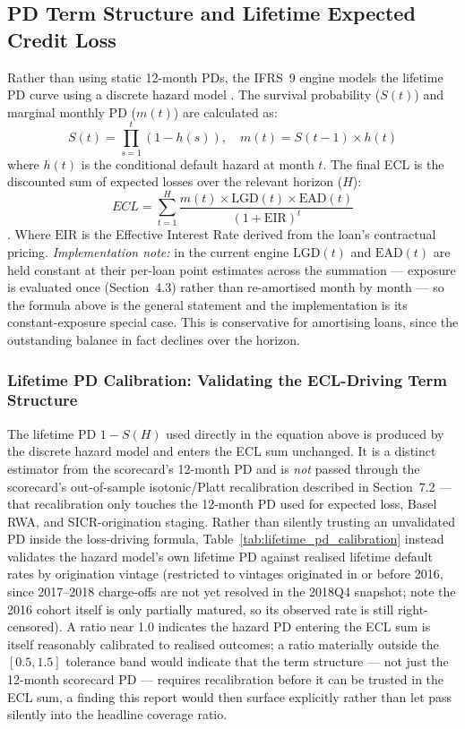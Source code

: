 \documentclass[11pt,a4paper]{article}
\begin{document}
\subsection{PD Term Structure and Lifetime Expected Credit Loss}
Rather than using static 12-month PDs, the IFRS~9 engine models the lifetime PD curve using a discrete hazard model \parencite[Ch.~7]{lando2004}. The survival probability ($S(t)$) and marginal monthly PD ($m(t)$) are calculated as:
\begin{equation}
S(t) = \prod_{s=1}^{t} (1 - h(s)), \quad m(t) = S(t-1) \times h(t)
\end{equation}
where $h(t)$ is the conditional default hazard at month $t$. The final ECL is the discounted sum of expected losses over the relevant horizon ($H$):
\begin{equation}
ECL = \sum_{t=1}^{H} \frac{m(t) \times \text{LGD}(t) \times \text{EAD}(t)}{(1 + \text{EIR})^t}
\end{equation}
\parencite{bellini2019}. Where $\text{EIR}$ is the Effective Interest Rate derived from the loan's contractual pricing. \emph{Implementation note:} in the current engine $\text{LGD}(t)$ and $\text{EAD}(t)$ are held constant at their per-loan point estimates across the summation --- exposure is evaluated once (Section~4.3) rather than re-amortised month by month --- so the formula above is the general statement and the implementation is its constant-exposure special case. This is conservative for amortising loans, since the outstanding balance in fact declines over the horizon.

\subsubsection*{Lifetime PD Calibration: Validating the ECL-Driving Term Structure}
The lifetime PD $1 - S(H)$ used directly in the equation above is produced by the discrete hazard model and enters the ECL sum unchanged. It is a distinct estimator from the scorecard's 12-month PD and is \emph{not} passed through the scorecard's out-of-sample isotonic/Platt recalibration described in Section~7.2 --- that recalibration only touches the 12-month PD used for expected loss, Basel RWA, and SICR-origination staging. Rather than silently trusting an unvalidated PD inside the loss-driving formula, Table~\ref{tab:lifetime_pd_calibration} instead validates the hazard model's own lifetime PD against realised lifetime default rates by origination vintage (restricted to vintages originated in or before 2016, since 2017--2018 charge-offs are not yet resolved in the 2018Q4 snapshot; note the 2016 cohort itself is only partially matured, so its observed rate is still right-censored). A ratio near 1.0 indicates the hazard PD entering the ECL sum is itself reasonably calibrated to realised outcomes; a ratio materially outside the $[0.5, 1.5]$ tolerance band would indicate that the term structure --- not just the 12-month scorecard PD --- requires recalibration before it can be trusted in the ECL sum, a finding this report would then surface explicitly rather than let pass silently into the headline coverage ratio.
\end{document}
